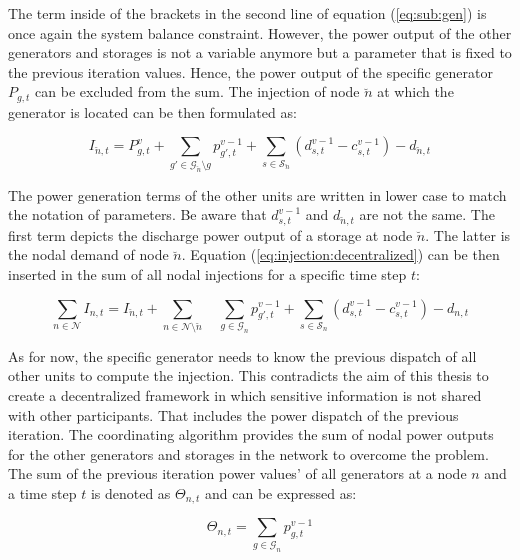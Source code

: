The term inside of the brackets in the second line of equation (\ref{eq:sub:gen}) is once again the system balance constraint. However, the power output of the other generators and storages is not a variable anymore but a parameter that is fixed to the previous iteration values. Hence, the power output of the specific generator $P_{g,t}$ can be excluded from the sum. The injection of node $\breve{n}$ at which the generator is located can be then formulated as:
 
 \begin{equation}
	I_{\breve{n},t} = P_{g,t}^v + \sum_{g'\in\mathcal{G}_{\breve{n}} \setminus g}p_{g',t}^{v-1} + \sum_{s\in\mathcal{S}_{\breve{n}}}(d_{s,t}^{v-1}-c_{s,t}^{v-1})-d_{\breve{n},t}
	\label{eq:injection:decentralized}
\end{equation} 
 
 The power generation terms of the other units are written in lower case to match the notation of parameters. Be aware that $d_{s,t}^{v-1}$ and $d_{\breve{n},t}$ are not the same. The first term depicts the discharge power output of a storage at node $\breve{n}$. The latter is the nodal demand of node $\breve{n}$. Equation (\ref{eq:injection:decentralized}) can be then inserted in the sum of all nodal injections for a specific time step $t$:
 
 \begin{equation}
 	\sum_{n \in \mathcal{N}} I_{n,t} = I_{\breve{n},t} + \sum_{n \in \mathcal{N} \setminus \breve{n}} \quad \sum_{g\in\mathcal{G}_n}p_{g',t}^{v-1} + \sum_{s\in\mathcal{S}_n}(d_{s,t}^{v-1}-c_{s,t}^{v-1})-d_{n,t}
 \end{equation}
 
 As for now, the specific generator needs to know the previous dispatch of all other units to compute the injection. This contradicts the aim of this thesis to create a decentralized framework in which sensitive information is not shared with other participants. That includes the power dispatch of the previous iteration. The coordinating algorithm provides the sum of nodal power outputs for the other generators and storages in the network to overcome the problem. The sum of the previous iteration power values' of all generators at a node $n$ and a time step $t$ is denoted as $\Theta_{n,t}$ and can be expressed as:
 
 \begin{equation}
 	\Theta_{n,t} = \sum_{g\in\mathcal{G}_{n}}p_{g,t}^{v-1}
 \end{equation}
 
